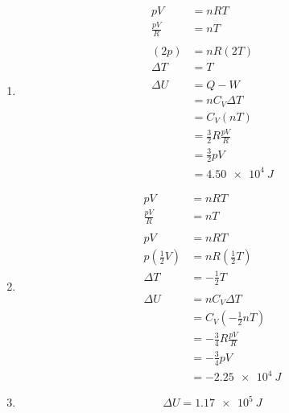 \documentclass{article}
\begin{document}
\subsubsection{}

\begin{enumerate}
  \item

        \begin{align*}
          p V           & = n R T                       \\
          \frac{p V}{R} & = n T                         \\ \\
          (2 p)         & = n R (2 T)                   \\
          \Delta T      & = T                           \\ \\
          \Delta U      & = Q - W                       \\
                        & = n C_V \Delta T              \\
                        & = C_V (n T)                   \\
                        & = \frac{3}{2} R \frac{p V}{R} \\
                        & = \frac{3}{2} p V             \\
                        & = \qty{4.50e4}{J}
        \end{align*}

  \item

        \begin{align*}
          p V                            & = n R T                               \\
          \frac{p V}{R}                  & = n T                                 \\ \\
          p V                            & = n R T                               \\
          p \left( \frac{1}{2} V \right) & = n R \left( \frac{1}{2} T \right)    \\
          \Delta T                       & = -\frac{1}{2} T                      \\ \\
          \Delta U                       & = n C_V \Delta T                      \\
                                         & = C_V \left( -\frac{1}{2} n T \right) \\
                                         & = -\frac{3}{4} R \frac{p V}{R}        \\
                                         & = -\frac{3}{4} p V                    \\
                                         & = \qty{-2.25e4}{J}
        \end{align*}

  \item \[\Delta U = \qty{1.17e5}{J}\]
\end{enumerate}
\end{document}

